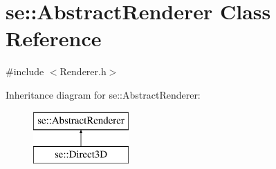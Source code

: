 \hypertarget{classse_1_1_abstract_renderer}{}\section{se\+:\+:Abstract\+Renderer Class Reference}
\label{classse_1_1_abstract_renderer}


{\ttfamily \#include $<$Renderer.\+h$>$}

Inheritance diagram for se\+:\+:Abstract\+Renderer\+:\begin{figure}[H]
\begin{center}
\leavevmode
\includegraphics[height=2.000000cm]{classse_1_1_abstract_renderer}
\end{center}
\end{figure}
